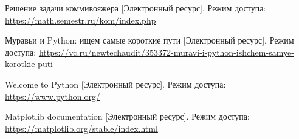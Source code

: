 


\renewcommand\bibname{Список использованных источников}
\begin{thebibliography}{}

	 Решение задачи коммивояжера [Электронный ресурс]. Режим доступа: \url{https://math.semestr.ru/kom/index.php}
	
	 Муравьи и Python: ищем самые короткие пути [Электронный ресурс]. Режим доступа: \url{https://vc.ru/newtechaudit/353372-muravi-i-python-ishchem-samye-korotkie-puti}
	
	 Welcome to Python [Электронный ресурс]. Режим доступа: \url{https://www.python.org/}
	
	 Matplotlib documentation [Электронный ресурс]. Режим доступа: \url{https://matplotlib.org/stable/index.html}
	
\end{thebibliography}
